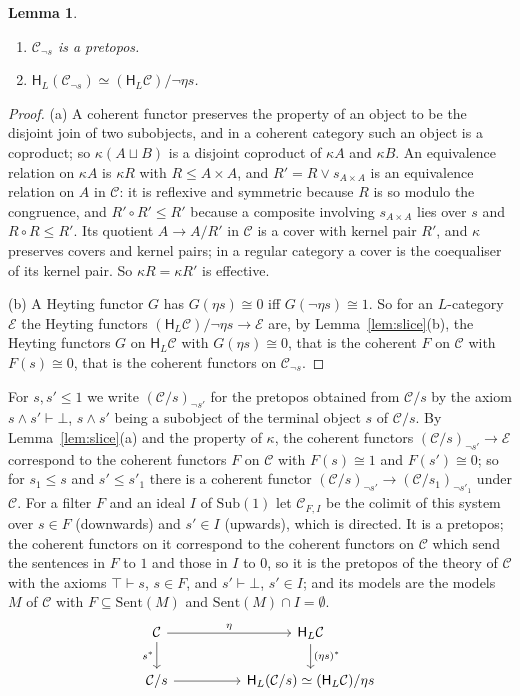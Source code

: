 \documentclass[11pt]{amsart}
\newtheorem{lem}[thm]{Lemma}
\theoremstyle{definition}
\newcommand{\Sub}{\mathrm{Sub}}
\newcommand{\Sent}{\mathrm{Sent}}
\newcommand{\HH}{\mathsf H}
\newcommand{\cC}{\mathcal C}
\newcommand{\cE}{\mathcal E}
\begin{document}
\begin{lem}\label{lem:closed}
\begin{enumerate}
\item[(a)] $\cC_{\neg s}$ is a pretopos.
\item[(b)] $\HH_L(\cC_{\neg s})\simeq(\HH_L\cC)/\neg\eta s$.
\end{enumerate}
\end{lem}
\begin{proof}
(a) A coherent functor preserves the property of an object to be the
disjoint join of two subobjects, and in a coherent category such an
object is a coproduct; so $\kappa(A\sqcup B)$ is a disjoint coproduct
of $\kappa A$ and $\kappa B$. An equivalence relation on $\kappa A$ is
$\kappa R$ with $R\le A\times A$, and $R'=R\vee s_{A\times A}$ is an
equivalence relation on $A$ in $\cC$: it is reflexive and symmetric
because $R$ is so modulo the congruence, and $R'\circ R'\le R'$ because
a composite involving $s_{A\times A}$ lies over $s$ and $R\circ R\le
R'$. Its quotient $A\to A/R'$ in $\cC$ is a cover with kernel pair
$R'$, and $\kappa$ preserves covers and kernel pairs; in a regular
category a cover is the coequaliser of its kernel pair. So $\kappa R=
\kappa R'$ is effective.

(b) A Heyting functor $G$ has $G(\eta s)\cong0$ iff $G(\neg\eta s)\cong
1$. So for an $L$-category $\cE$ the Heyting functors $(\HH_L\cC)/\neg
\eta s\to\cE$ are, by Lemma~\ref{lem:slice}(b), the Heyting functors
$G$ on $\HH_L\cC$ with $G(\eta s)\cong0$, that is the coherent $F$ on
$\cC$ with $F(s)\cong0$, that is the coherent functors on $\cC_{\neg
s}$.
\end{proof}

For $s,s'\le1$ we write $(\cC/s)_{\neg s'}$ for the pretopos obtained
from $\cC/s$ by the axiom $s\wedge s'\vdash\bot$, $s\wedge s'$ being a
subobject of the terminal object $s$ of $\cC/s$. By
Lemma~\ref{lem:slice}(a) and the property of $\kappa$, the coherent
functors $(\cC/s)_{\neg s'}\to\cE$ correspond to the coherent functors
$F$ on $\cC$ with $F(s)\cong1$ and $F(s')\cong0$; so for $s_1\le s$ and
$s'\le s'_1$ there is a coherent functor $(\cC/s)_{\neg s'}\to
(\cC/s_1)_{\neg s'_1}$ under $\cC$. For a filter $F$ and an ideal $I$
of $\Sub(1)$ let $\cC_{F,I}$ be the colimit of this system over $s\in
F$ (downwards) and $s'\in I$ (upwards), which is directed. It is a
pretopos; the coherent functors on it correspond to the coherent
functors on $\cC$ which send the sentences in $F$ to $1$ and those in
$I$ to $0$, so it is the pretopos of the theory of $\cC$ with the
axioms $\top\vdash s$, $s\in F$, and $s'\vdash\bot$, $s'\in I$; and its
models are the models $M$ of $\cC$ with $F\subseteq\Sent(M)$ and
$\Sent(M)\cap I=\emptyset$.
\[
\begin{tikzcd}[column sep=huge]
\cC\ar[r,"\eta"]\ar[d,"s^*"']&\HH_L\cC\ar[d,"(\eta s)^*"]\\
\cC/s\ar[r]&\HH_L(\cC/s)\simeq(\HH_L\cC)/\eta s
\end{tikzcd}
\]
\end{document}

